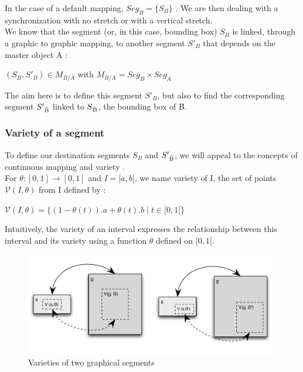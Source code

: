 \documentclass[a4paper]{article}
\newcommand{\variete}			{\ensuremath{\mathcal{V}}}
\begin{document}
In the case of a default mapping, $Seg_B = \{S_B\}$ . We are then dealing with a synchronization with no stretch or with a vertical stretch. 
\\

We know that the segment (or, in this case, bounding box) $S_B$ is linked, through a graphic to graphic mapping, to another segment $S'_B$ that depends on the master object A : 

\begin{center} $(S_B, S'_B) \in M_{B/A}$ with $M_{B/A} = Seg_B \times Seg_A$ \end{center}

The aim here is to define this segment $S'_B$, but also to find the corresponding segment $S'\textsubscript{\r{B}}$ linked to $S\textsubscript{\r{B}}$, the bounding box of \r{B}.

\subsubsection{Variety of a segment}\label{subsubsec:variety}

To define our destination segments $S_B$ and $S'\textsubscript{\r{B}}$, we will appeal to the concepts of continuous mapping and variety .%
\\

For $\theta : [0,1] \rightarrow [0,1]$ and $I = [a,b[$, we name variety of I, the set of points $\variete(I,\theta)$ from I defined by :
\begin{center}
$\variete(I, \theta) =  \lbrace (1 - \theta(t)).a + \theta(t).b \mid t \in [0, 1[ \rbrace$ 
\end{center}

Intuitively, the variety of an interval expresses the relationship between this interval and its variety using a function $\theta$ defined on $[0, 1[$.
\\
\begin{figure}[h]
\centering
\includegraphics[width=11cm]{img/vmapping.pdf}
\caption{Varieties of two graphical segments}
\label{fig:variety}
\end{figure}
\end{document}

